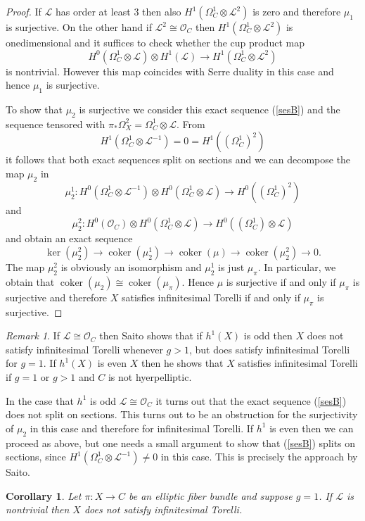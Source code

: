 \documentclass{amsart}
\newcommand{\cL}{\mathcal{L}}
\newcommand{\cO}{\mathcal{O}}
\newtheorem{corollary}[theorem]{Corollary}
\theoremstyle{definition}
\theoremstyle{remark}
\newtheorem{remark}[theorem]{Remark}
\DeclareMathOperator{\coker}{coker}
\begin{document}
\begin{proof}
If $\cL$ has order at least 3 then also $H^1(\Omega_C^1\otimes \cL^2)$ is zero and therefore $\mu_1$ is surjective. On the other hand if $\cL^2\cong \cO_C$ then  $H^1(\Omega^1_C\otimes \cL^2)$ is onedimensional and it suffices to check whether the cup product map
\[ H^0(\Omega^1_C\otimes \cL)\otimes H^1(\cL) \to H^1(\Omega_C^1\otimes \cL^2)\]
is nontrivial. However this map coincides with Serre duality in this case and hence  $\mu_1$ is surjective.

To show that $\mu_2$ is surjective we consider this exact sequence (\ref{sesB})
and the sequence tensored  with $ \pi_*\Omega_X^2=\Omega^1_C\otimes \cL$. From 
\[H^1( \Omega^1_C \otimes \cL^{-1})=0=H^1((\Omega^1_C)^2)\]
it follows that both exact sequences split on sections and we can decompose the map $\mu_2$ in
\[ \mu_2^1: H^0(\Omega^1_C\otimes \cL^{-1}) \otimes H^0(\Omega^1_C\otimes \cL)\to H^0((\Omega^1_C)^2)\]
and
\[ \mu_2^2:H^0( \cO_C) \otimes H^0(\Omega^1_C\otimes \cL)\to H^0((\Omega^1_C)\otimes \cL)\]
and obtain an exact sequence
\[ \ker(\mu_2^2)\to \coker(\mu_2^1)\to\coker(\mu)\to \coker(\mu_2^2)\to 0.\]
The  map $\mu_2^2$ is obviously an isomorphism and $\mu_2^1$ is just  $\mu_\pi$. In particular, we obtain that $\coker(\mu_2)\cong \coker(\mu_\pi)$. Hence $\mu$ is surjective if and only if $\mu_\pi$ is surjective and therefore $X$ satisfies infinitesimal Torelli if and only if $\mu_\pi$ is surjective.
\end{proof}

\begin{remark}
If $\cL\cong \cO_C$ then Saito shows that if $h^1(X)$ is odd then $X$ does not satisfy infinitesimal Torelli whenever $g>1$, but does satisfy infinitesimal Torelli for $g=1$. If $h^1(X)$ is even $X$ then he shows that $X$ satisfies infinitesimal Torelli if $g=1$ or $g>1$ and $C$ is not hyerpelliptic.

In the case that $h^1$ is odd $\cL\cong \cO_C$ it turns out that the exact sequence (\ref{sesB}) does not split on sections. This turns  out to be an obstruction for the surjectivity of $\mu_2$ in this case and therefore for infinitesimal Torelli.
If $h^1$ is even then we can proceed as above, but one needs a small argument to show that  (\ref{sesB}) splits on sections, since $H^1( \Omega^1_C \otimes \cL^{-1})\neq 0$ in this case. This is precisely the approach by Saito.
\end{remark}

\begin{corollary}Let $\pi: X \to C$ be an elliptic fiber bundle and suppose $g=1$. If $\cL$ is nontrivial then $X$ does not satisfy infinitesimal Torelli.
\end{corollary}
\end{document}
